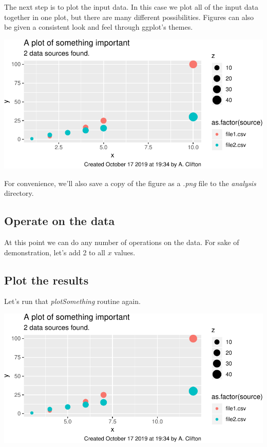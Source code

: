 \documentclass[10pt,]{article}
\newenvironment{Shaded}{\begin{snugshade}}{\end{snugshade}}
\newcommand{\FloatTok}[1]{\textcolor[rgb]{0.00,0.00,0.81}{#1}}
\newcommand{\NormalTok}[1]{#1}
\newcommand{\OperatorTok}[1]{\textcolor[rgb]{0.81,0.36,0.00}{\textbf{#1}}}
\newcommand{\StringTok}[1]{\textcolor[rgb]{0.31,0.60,0.02}{#1}}
\begin{document}
The next step is to plot the input data. In this case we plot all of the input data together in one plot, but there are many different possibilities. Figures can also be given a consistent look and feel through ggplot's themes.

\includegraphics{main_files/figure-latex/plot input data-1.pdf}

For convenience, we'll also save a copy of the figure as a \emph{.png} file to the \emph{analysis} directory.

\hypertarget{operate-on-the-data}{%
\subsection{Operate on the data}\label{operate-on-the-data}}

At this point we can do any number of operations on the data. For sake of demonstration, let's add 2 to all \(x\) values.

\begin{Shaded}
\end{Shaded}

\hypertarget{plot-the-results}{%
\subsection{Plot the results}\label{plot-the-results}}

Let's run that \emph{plotSomething} routine again.

\includegraphics{main_files/figure-latex/plot modified data-1.pdf}
\end{document}
